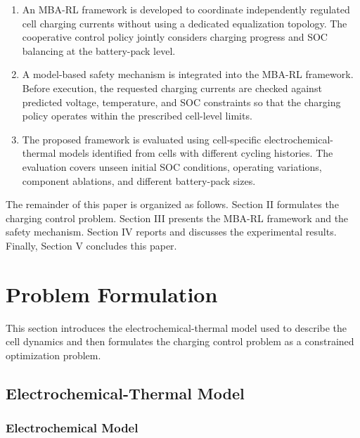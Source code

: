 \documentclass[10pt,journal,letterpaper]{IEEEtran}
\begin{document}
\begin{enumerate}

    \item An MBA-RL framework is developed to coordinate independently regulated cell charging currents without using a dedicated equalization topology. The cooperative control policy jointly considers charging progress and SOC balancing at the battery-pack level.

    \item A model-based safety mechanism is integrated into the MBA-RL framework. Before execution, the requested charging currents are checked against predicted voltage, temperature, and SOC constraints so that the charging policy operates within the prescribed cell-level limits.

    \item The proposed framework is evaluated using cell-specific electrochemical-thermal models identified from cells with different cycling histories. The evaluation covers unseen initial SOC conditions, operating variations, component ablations, and different battery-pack sizes.

\end{enumerate}

The remainder of this paper is organized as follows. Section II formulates the charging control problem. Section III presents the MBA-RL framework and the safety mechanism. Section IV reports and discusses the experimental results. Finally, Section V concludes this paper.

\section{Problem Formulation}

This section introduces the electrochemical-thermal model used to describe the cell dynamics and then formulates the charging control problem as a constrained optimization problem.

\subsection{Electrochemical-Thermal Model}

\subsubsection{Electrochemical Model}
\end{document}
